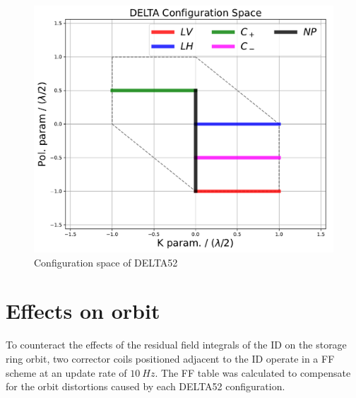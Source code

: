 \documentclass[a4paper,
               keeplastbox,   %
               ]{jacow}
\begin{document}
\begin{figure}[]
    \centering
   \includegraphics[width=.65\columnwidth]{THPS18_f1.pdf}
   \caption{Configuration space of DELTA52}
   \label{fig:config_space}
\end{figure}

\section{Effects on orbit}

To counteract the effects of the residual field integrals of the ID on the storage ring orbit, two corrector coils positioned adjacent to the ID operate in a FF scheme at an update rate of $\SI{10}{Hz}$. The FF table was calculated to compensate for the orbit distortions caused by each DELTA52 configuration.
\end{document}
